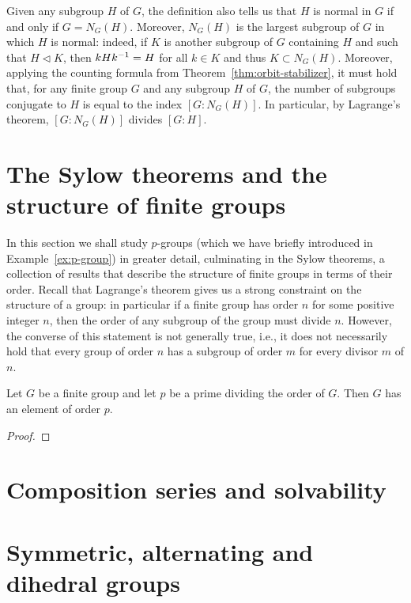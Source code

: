 Given any subgroup \(H\) of \(G\), the definition also tells us that \(H\) is
normal in \(G\) if and only if \(G = N_G(H)\). Moreover, \(N_G(H)\) is the
largest subgroup of \(G\) in which \(H\) is normal: indeed, if \(K\) is another
subgroup of \(G\) containing \(H\) and such that \(H \triangleleft K\), then
\(kHk^{-1} = H\) for all \(k \in K\) and thus \(K \subset N_G(H)\). Moreover,
applying the counting formula from Theorem~\ref{thm:orbit-stabilizer}, it must
hold that, for any finite group \(G\) and any subgroup \(H\) of \(G\), the
number of subgroups conjugate to \(H\) is equal to the index \([G : N_G(H)]\).
In particular, by Lagrange's theorem, \([G : N_G(H)]\) divides \([G : H]\).

\section[Sylow theorems]{The Sylow theorems and the structure of finite groups}
\label{sec:sylow-theorems}

In this section we shall study \(p\)-groups (which we have briefly introduced in
Example~\ref{ex:p-group}) in greater detail, culminating in the Sylow theorems,
a collection of results that describe the structure of finite groups in terms of
their order. Recall that Lagrange's theorem gives us a strong constraint on the
structure of a group: in particular if a finite group has order \(n\) for some
positive integer \(n\), then the order of any subgroup of the group must divide
\(n\). However, the converse of this statement is not generally true, i.e., it
does not necessarily hold that every group of order \(n\) has a subgroup of
order \(m\) for every divisor \(m\) of \(n\). 


\begin{theorem}[Cauchy]
    \label{thm:cauchy}
    Let \(G\) be a finite group and let \(p\) be a prime dividing the order of
    \(G\). Then \(G\) has an element of order \(p\).
\end{theorem}

\begin{proof}
    
\end{proof}

\section[Composition series]{Composition series and solvability}

\section{Symmetric, alternating and dihedral groups}
\label{sec:sym-alt-dihedral}

